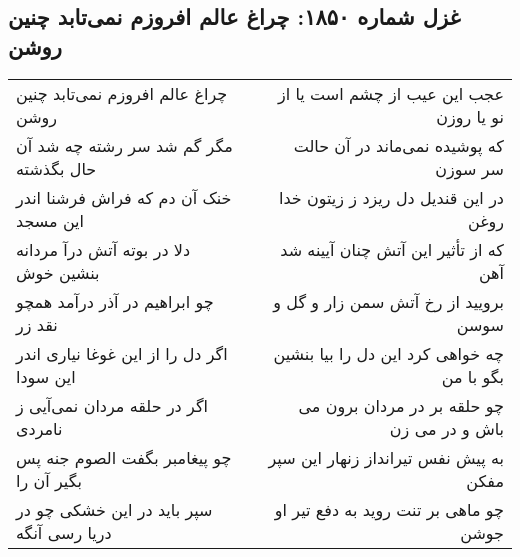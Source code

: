 \begin{center}
\section*{غزل شماره ۱۸۵۰: چراغ عالم افروزم نمی‌تابد چنین روشن}
\label{sec:1850}
\begin{longtable}{l p{0.5cm} r}
چراغ عالم افروزم نمی‌تابد چنین روشن
&&
عجب این عیب از چشم است یا از نو یا روزن
\\
مگر گم شد سر رشته چه شد آن حال بگذشته
&&
که پوشیده نمی‌ماند در آن حالت سر سوزن
\\
خنک آن دم که فراش فرشنا اندر این مسجد
&&
در این قندیل دل ریزد ز زیتون خدا روغن
\\
دلا در بوته آتش درآ مردانه بنشین خوش
&&
که از تأثیر این آتش چنان آیینه شد آهن
\\
چو ابراهیم در آذر درآمد همچو نقد زر
&&
برویید از رخ آتش سمن زار و گل و سوسن
\\
اگر دل را از این غوغا نیاری اندر این سودا
&&
چه خواهی کرد این دل را بیا بنشین بگو با من
\\
اگر در حلقه مردان نمی‌آیی ز نامردی
&&
چو حلقه بر در مردان برون می باش و در می زن
\\
چو پیغامبر بگفت الصوم جنه پس بگیر آن را
&&
به پیش نفس تیرانداز زنهار این سپر مفکن
\\
سپر باید در این خشکی چو در دریا رسی آنگه
&&
چو ماهی بر تنت روید به دفع تیر او جوشن
\\
\end{longtable}
\end{center}
